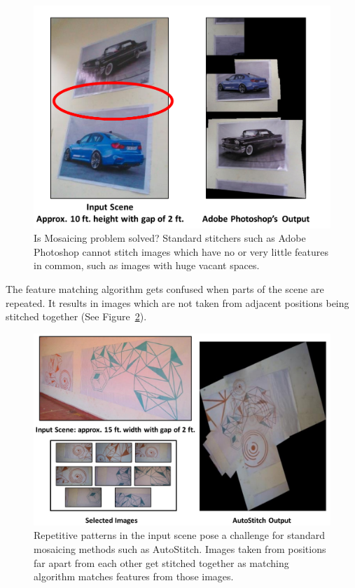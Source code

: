 \begin{itemize}
  \begin{figure}[h!]
\centering
\includegraphics[width=0.98\linewidth]{figures/vacantSpacesExample}
 \caption[Problem of mosaicing scene with vacant spaces using Adobe
 Photoshop]{Is Mosaicing problem solved? Standard stitchers such as Adobe Photoshop cannot stitch images which have no or very little features in
 common, such as images with huge vacant spaces.}
\label{fig:vacantSpacesExample}
\end{figure}
 
  The feature matching algorithm gets confused when parts of the scene are
  repeated. It results in images which are not taken from adjacent positions
  being stitched together (See Figure~\ref{fig:confusingFeatures}).

\begin{figure}[h!]
\centering
\includegraphics[width=0.98\linewidth]{figures/confusingFeaturesExample}
\caption[Problem of confusing features in AutoStitch]{Repetitive patterns in the
input scene pose a challenge for standard mosaicing methods such as AutoStitch. Images taken from positions
far apart from each other get stitched together as matching algorithm matches
features from those images.}
\label{fig:confusingFeatures}
\end{figure}  


\end{itemize}
